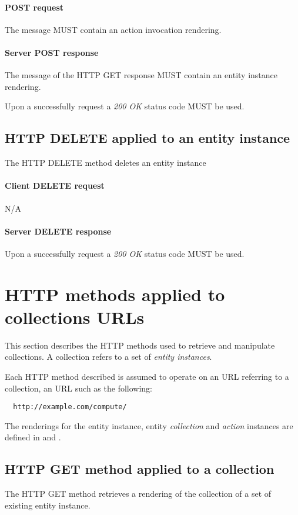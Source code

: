 \documentclass[10pt,a4paper]{article}
\begin{document}
\paragraph{POST request}
The message MUST contain an action invocation rendering.

\paragraph{Server POST response}
The message of the HTTP GET response MUST contain an entity instance rendering.

Upon a successfully request a \emph{200 OK} status code MUST be used.

\subsection{HTTP DELETE applied to an entity instance}
The HTTP DELETE method deletes an entity instance

\paragraph{Client DELETE request}
N/A

\paragraph{Server DELETE response}
Upon a successfully request a \emph{200 OK} status code MUST be used.

\section{HTTP methods applied to collections URLs}
This section describes the HTTP methods used to retrieve and manipulate
collections. A collection refers to a set of {\em entity instances}.

Each HTTP method described is assumed to operate
on an URL referring to a collection, an URL such as the following:
\begin{verbatim}
  http://example.com/compute/
\end{verbatim}

The renderings for the entity instance, entity {\em collection} and {\em action} instances are defined in \cite{occi:text} and \cite{occi:json}.

\subsection{HTTP GET method applied to a collection}
The HTTP GET method retrieves a rendering of the collection of a set of existing entity instance.
\end{document}
